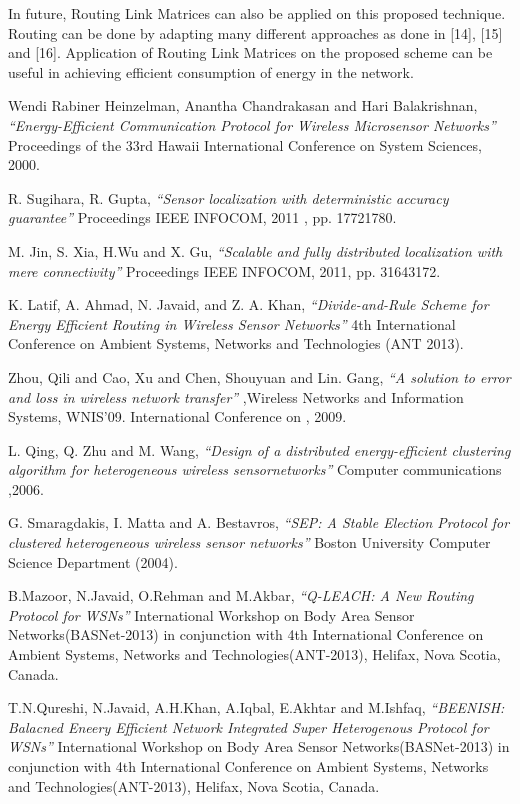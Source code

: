 \documentclass[journal]{IEEEtran}
\begin{document}
In future, Routing Link Matrices can also be applied on this proposed technique. Routing can be done by adapting many different approaches as done in [14], [15] and [16]. Application of Routing Link Matrices on the proposed scheme can be useful in achieving efficient consumption of energy in the network.


\begin{thebibliography}{1}

 Wendi Rabiner Heinzelman, Anantha Chandrakasan and Hari Balakrishnan, {\em ``Energy-Efficient Communication Protocol for Wireless Microsensor Networks''}   Proceedings of the 33rd Hawaii International Conference on System Sciences, 2000.

 R. Sugihara, R. Gupta, {\em ``Sensor localization with deterministic accuracy guarantee''} Proceedings IEEE INFOCOM, 2011 , pp. 17721780.

 M. Jin, S. Xia, H.Wu and X. Gu, {\em ``Scalable and fully distributed localization with mere connectivity''} Proceedings IEEE INFOCOM, 2011, pp. 31643172.

 K. Latif, A. Ahmad, N. Javaid, and Z. A. Khan, {\em ``Divide-and-Rule Scheme for Energy Efficient Routing in Wireless Sensor Networks''} 4th International Conference on Ambient Systems, Networks and Technologies (ANT 2013).

  Zhou, Qili and Cao, Xu and Chen, Shouyuan and Lin. Gang, {\em ``A solution to error and loss in wireless network transfer''} ,Wireless Networks and Information Systems, WNIS'09. International Conference on , 2009.

 L. Qing, Q. Zhu and M. Wang, {\em ``Design of a distributed energy-efficient clustering algorithm for heterogeneous wireless sensornetworks'' } Computer communications ,2006.

 G. Smaragdakis, I. Matta and A. Bestavros, {\em ``SEP: A Stable Election Protocol for clustered heterogeneous wireless sensor networks'' } Boston University Computer Science Department (2004).

 B.Mazoor, N.Javaid, O.Rehman and M.Akbar, {\em ``Q-LEACH: A New Routing Protocol for WSNs'' } International Workshop on Body Area Sensor Networks(BASNet-2013) in conjunction with 4th International Conference on Ambient Systems, Networks and Technologies(ANT-2013), Helifax, Nova Scotia, Canada.

 T.N.Qureshi, N.Javaid, A.H.Khan, A.Iqbal, E.Akhtar and M.Ishfaq, {\em ``BEENISH: Balacned Eneery Efficient Network Integrated Super Heterogenous Protocol for WSNs'' } International Workshop on Body Area Sensor Networks(BASNet-2013) in conjunction with 4th International Conference on Ambient Systems, Networks and Technologies(ANT-2013), Helifax, Nova Scotia, Canada.


\end{thebibliography}
\end{document}
